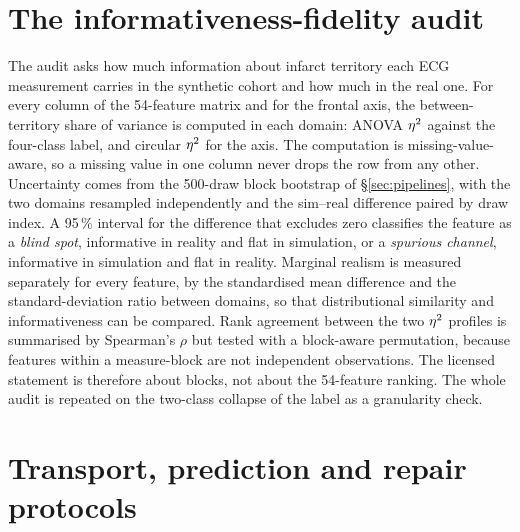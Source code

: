 \section{The informativeness-fidelity audit}
\label{sec:audit-method}

The audit asks how much information about infarct territory each ECG measurement carries in the synthetic cohort and how much in the real one. For every column of the 54-feature matrix and for the frontal axis, the between-territory share of variance is computed in each domain: ANOVA $\eta^{2}$ against the four-class label, and circular $\eta^{2}$ for the axis. The computation is missing-value-aware, so a missing value in one column never drops the row from any other. Uncertainty comes from the 500-draw block bootstrap of \S\ref{sec:pipelines}, with the two domains resampled independently and the sim--real difference paired by draw index. A 95\,\% interval for the difference that excludes zero classifies the feature as a \emph{blind spot}, informative in reality and flat in simulation, or a \emph{spurious channel}, informative in simulation and flat in reality. Marginal realism is measured separately for every feature, by the standardised mean difference and the standard-deviation ratio between domains, so that distributional similarity and informativeness can be compared. Rank agreement between the two $\eta^{2}$ profiles is summarised by Spearman's $\rho$ but tested with a block-aware permutation, because features within a measure-block are not independent observations. The licensed statement is therefore about blocks, not about the 54-feature ranking. The whole audit is repeated on the two-class collapse of the label as a granularity check. 

\section[Transport, prediction and repair]{Transport, prediction and repair protocols}
\label{sec:transport-method}

